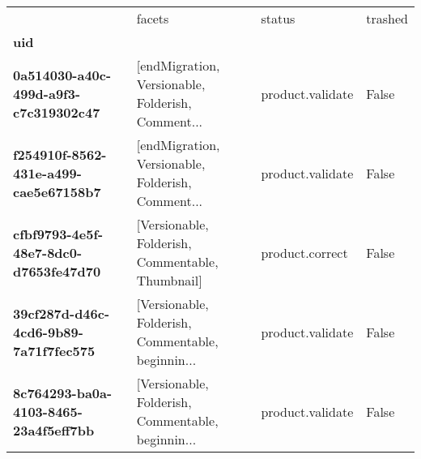 \begin{tabularx}{\linewidth}{lXXX}
\toprule
{} &                                             facets &            status &  trashed \\
\textbf{uid                                 } &                                                    &                   &          \\
\midrule
\textbf{0a514030-a40c-499d-a9f3-c7c319302c47} &  [endMigration, Versionable, Folderish, Comment... &  product.validate &    False \\
\textbf{f254910f-8562-431e-a499-cae5e67158b7} &  [endMigration, Versionable, Folderish, Comment... &  product.validate &    False \\
\textbf{cfbf9793-4e5f-48e7-8dc0-d7653fe47d70} &   [Versionable, Folderish, Commentable, Thumbnail] &   product.correct &    False \\
\textbf{39cf287d-d46c-4cd6-9b89-7a71f7fec575} &  [Versionable, Folderish, Commentable, beginnin... &  product.validate &    False \\
\textbf{8c764293-ba0a-4103-8465-23a4f5eff7bb} &  [Versionable, Folderish, Commentable, beginnin... &  product.validate &    False \\
\bottomrule
\end{tabularx}
